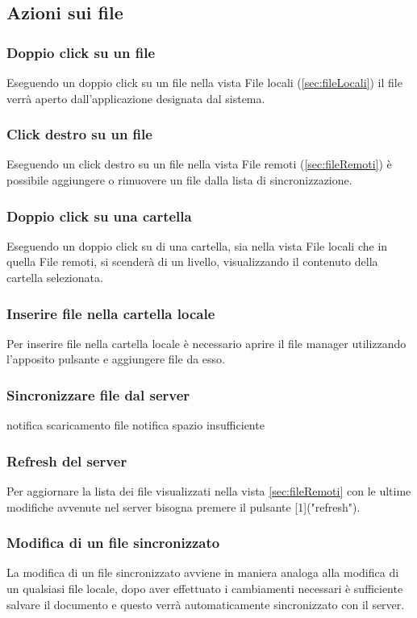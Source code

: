 \subsection{Azioni sui file}
\label{sec:fileActions}

\subsubsection*{Doppio click su un file}
Eseguendo un doppio click su un file nella vista File locali (\ref{sec:fileLocali}) il file verrà aperto dall'applicazione designata dal sistema.
\subsubsection*{Click destro su un file}
Eseguendo un click destro su un file nella vista File remoti (\ref{sec:fileRemoti}) è possibile aggiungere o rimuovere un file dalla lista di sincronizzazione.
\subsubsection*{Doppio click su una cartella}
Eseguendo un doppio click su di una cartella, sia nella vista File locali che in quella File remoti, si scenderà di un livello, visualizzando il contenuto della cartella selezionata.
\subsubsection*{Inserire file nella cartella locale}
Per inserire file nella cartella locale è necessario aprire il file manager utilizzando l'apposito pulsante e aggiungere file da esso.
\subsubsection*{Sincronizzare file dal server}
notifica scaricamento file \newline
notifica spazio insufficiente
\subsubsection*{Refresh del server}
Per aggiornare la lista dei file visualizzati nella vista \ref{sec:fileRemoti} con le ultime modifiche avvenute nel server bisogna premere il pulsante [1]("refresh").
\subsubsection*{Modifica di un file sincronizzato}
La modifica di un file sincronizzato avviene in maniera analoga alla modifica di un qualsiasi file locale, dopo aver effettuato i cambiamenti necessari è sufficiente salvare il documento e questo verrà automaticamente sincronizzato con il server.
